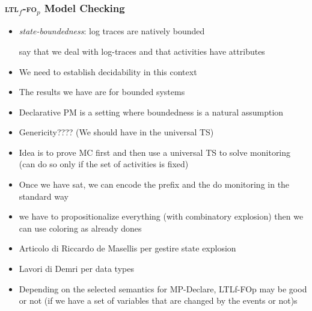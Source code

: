 \documentclass{beamer}
\newcommand{\ltlf}{\textsc{ltl}$_f$\xspace}
\newcommand{\ltlffop}{\ltlf-\textsc{fo}$_p$\xspace}
\begin{document}

\begin{frame}
\frametitle{\ltlffop  Model Checking}



\begin{itemize}	
	\item \emph{state-boundedness}: log traces are natively bounded 
	
	
	say that we deal with log-traces and that activities have attributes
	\item We need to establish decidability in this context
\end{itemize}

\begin{itemize}
	\item The results we have are for bounded systems
	\item Declarative PM is a setting where boundedness is a natural assumption
	\item Genericity???? (We should have in the universal TS)
	\item Idea is to prove MC first and then use a universal TS to solve monitoring
		(can do so only if the set of activities is fixed)
	\item Once we have sat, we can encode the prefix and the do monitoring in the standard way
	\item we have to propositionalize everything (with combinatory explosion) then we can use coloring as 
	already dones
	\item Articolo di Riccardo de Masellis per gestire state explosion
	\item Lavori di Demri per data types
	\item Depending on the selected semantics for MP-Declare, LTLf-FOp may be 
		good or not (if we have a set of variables that are changed by the events or not)s
\end{itemize}

\end{frame}

\end{document}
